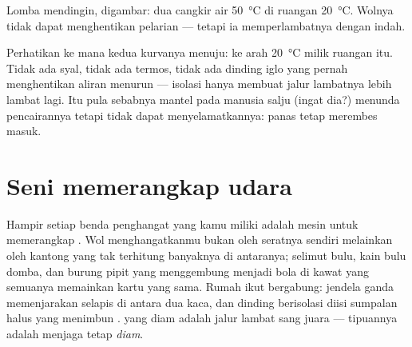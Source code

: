 \begin{omfigure}

{\small Lomba mendingin, digambar: dua cangkir air \qty{50}{\celsius}
di ruangan \qty{20}{\celsius}. Wolnya tidak dapat menghentikan
pelarian  --- tetapi ia memperlambatnya dengan indah.}
\end{omfigure}

\begin{remark}\label{rem:g5:heat-and-insulation:onlyslows}
Perhatikan ke mana kedua kurvanya menuju: ke arah \qty{20}{\celsius}
milik ruangan itu. Tidak ada syal, tidak ada termos, tidak ada dinding
iglo yang pernah menghentikan aliran menurun  --- isolasi hanya
membuat jalur lambatnya lebih lambat lagi. Itu pula sebabnya mantel
pada manusia salju (ingat dia?) menunda pencairannya tetapi tidak
dapat menyelamatkannya:   panas tetap merembes masuk.
\end{remark}

\section{Seni memerangkap udara}

\begin{example}\label{ex:g5:heat-and-insulation:air}
Hampir setiap benda penghangat yang kamu miliki adalah mesin untuk
memerangkap . Wol menghangatkanmu bukan oleh seratnya sendiri
melainkan oleh kantong  yang tak terhitung banyaknya di
antaranya; selimut bulu, kain bulu domba, dan burung pipit yang
menggembung menjadi bola di kawat yang  semuanya memainkan
kartu yang sama. Rumah ikut bergabung: jendela ganda memenjarakan
selapis  di antara dua kaca, dan dinding berisolasi diisi
sumpalan halus yang menimbun .  yang diam adalah jalur
lambat sang juara --- tipuannya adalah menjaga  tetap
\emph{diam}.
\end{example}

